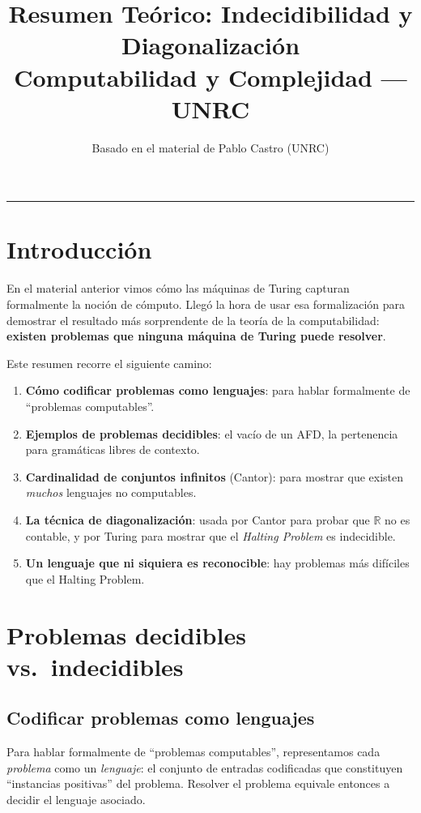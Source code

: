 \documentclass[11pt,a4paper]{article}
\title{\textbf{Resumen Teórico: Indecidibilidad y Diagonalización}\\[0.3em]
\large Computabilidad y Complejidad --- UNRC}
\author{Basado en el material de Pablo Castro (UNRC)}
\date{}
\theoremstyle{definicion}
\newcommand{\R}{\mathbb{R}}
\begin{document}
\maketitle

\tableofcontents

\vspace{1em}
\hrule
\vspace{1em}

\section{Introducción}

En el material anterior vimos cómo las máquinas de Turing capturan formalmente la noción de cómputo. Llegó la hora de usar esa formalización para demostrar el resultado más sorprendente de la teoría de la computabilidad: \textbf{existen problemas que ninguna máquina de Turing puede resolver}.

Este resumen recorre el siguiente camino:
\begin{enumerate}
    \item \textbf{Cómo codificar problemas como lenguajes}: para hablar formalmente de ``problemas computables''.
    \item \textbf{Ejemplos de problemas decidibles}: el vacío de un AFD, la pertenencia para gramáticas libres de contexto.
    \item \textbf{Cardinalidad de conjuntos infinitos} (Cantor): para mostrar que existen \emph{muchos} lenguajes no computables.
    \item \textbf{La técnica de diagonalización}: usada por Cantor para probar que $\R$ no es contable, y por Turing para mostrar que el \emph{Halting Problem} es indecidible.
    \item \textbf{Un lenguaje que ni siquiera es reconocible}: hay problemas más difíciles que el Halting Problem.
\end{enumerate}

\section{Problemas decidibles vs.\ indecidibles}

\subsection{Codificar problemas como lenguajes}

Para hablar formalmente de ``problemas computables'', representamos cada \emph{problema} como un \emph{lenguaje}: el conjunto de entradas codificadas que constituyen ``instancias positivas'' del problema. Resolver el problema equivale entonces a decidir el lenguaje asociado.
\end{document}
